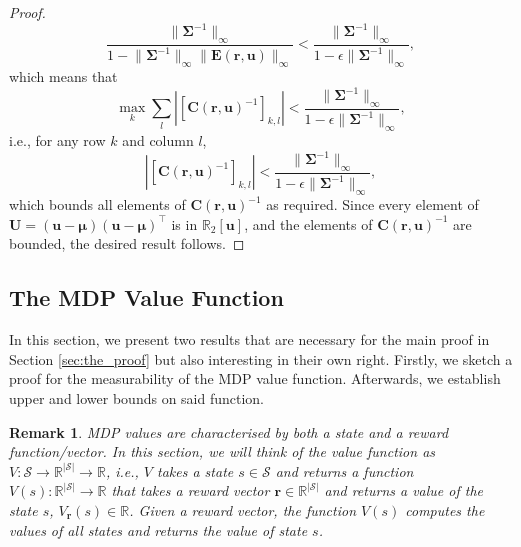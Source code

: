 \documentclass{mpaper}
\newtheorem{remark}[theorem]{Remark}
\newcommand{\V}{V_{\mathbf{r}}}
\begin{document}
\begin{proof}
\[    \frac{\lVert \bm\Sigma^{-1} \rVert_\infty}{1 - \lVert \bm\Sigma^{-1}
      \rVert_\infty \lVert \mathbf{E}(\mathbf{r}, \mathbf{u}) \rVert_\infty} <
    \frac{\lVert \bm\Sigma^{-1} \rVert_\infty}{1 - \epsilon \lVert
      \bm\Sigma^{-1} \rVert_\infty},
  \]
  which means that
  \[
    \max_k \sum_l \left| [\mathbf{C}(\mathbf{r}, \mathbf{u})^{-1}]_{k,l} \right|
    < \frac{\lVert \bm\Sigma^{-1} \rVert_\infty}{1 - \epsilon \lVert
      \bm\Sigma^{-1} \rVert_\infty},
  \]
  i.e., for any row $k$ and column $l$,
  \[
    \left| [\mathbf{C}(\mathbf{r}, \mathbf{u})^{-1}]_{k,l} \right| <
    \frac{\lVert \bm\Sigma^{-1} \rVert_\infty}{1 - \epsilon \lVert
      \bm\Sigma^{-1} \rVert_\infty},
  \]
  which bounds all elements of $\mathbf{C}(\mathbf{r}, \mathbf{u})^{-1}$ as
  required. Since every element of $\mathbf{U} = (\mathbf{u} - \bm\mu)(\mathbf{u} -
  \bm\mu)^\intercal$ is in $\mathbb{R}_2[\mathbf{u}]$, and the elements of
  $\mathbf{C}(\mathbf{r}, \mathbf{u})^{-1}$ are bounded, the desired result
  follows.
\end{proof}

\subsection{The MDP Value Function} \label{sec:propositions}

In this section, we present two results that are necessary for the main proof in
Section \ref{sec:the_proof} but also interesting in their own right. Firstly, we
sketch a proof for the measurability of the MDP value function. Afterwards, we
establish upper and lower bounds on said function.

\begin{remark}
  MDP values are characterised by both a state and a reward function/vector. In
  this section, we will think of the value function as $V : \mathcal{S} \to
  \mathbb{R}^{|\mathcal{S}|} \to \mathbb{R}$, i.e., $V$ takes a state $s \in
  \mathcal{S}$ and returns a function $V(s) : \mathbb{R}^{|\mathcal{S}|} \to
  \mathbb{R}$ that takes a reward vector $\mathbf{r} \in
  \mathbb{R}^{|\mathcal{S}|}$ and returns a value of the state $s$, $\V(s) \in
  \mathbb{R}$. Given a reward vector, the function $V(s)$ computes the values of
  all states and returns the value of state $s$.
\end{remark}
\end{document}
